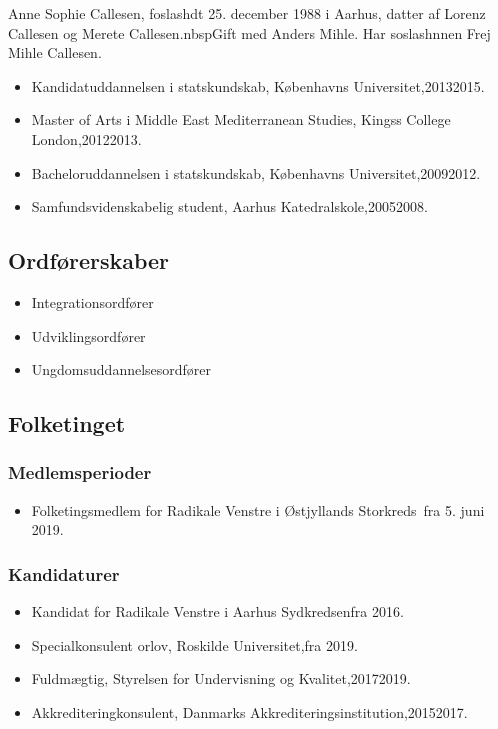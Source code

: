 \documentclass[11pt, a4paper]{awesome-cv}
\begin{document}
\makecvheader[R]
\makelettertitle
\begin{cvletter}
Anne Sophie Callesen, foslashdt 25. december 1988 i Aarhus, datter af Lorenz Callesen og Merete Callesen.nbspGift med Anders Mihle. Har soslashnnen Frej Mihle Callesen.

\begin{itemize}
\item Kandidatuddannelsen i statskundskab, Københavns Universitet,20132015.
\item Master of Arts i Middle East  Mediterranean Studies, Kingss College London,20122013.
\item Bacheloruddannelsen i statskundskab, Københavns Universitet,20092012.
\item Samfundsvidenskabelig student, Aarhus Katedralskole,20052008.
\end{itemize}
\subsection*{Ordførerskaber}
\begin{itemize}
\item Integrationsordfører
\item Udviklingsordfører
\item Ungdomsuddannelsesordfører
\end{itemize}
\subsection*{Folketinget}
\subsubsection*{Medlemsperioder}
\begin{itemize}
\item Folketingsmedlem for Radikale Venstre i Østjyllands Storkreds fra 5. juni 2019.
\end{itemize}
\subsubsection*{Kandidaturer}
\begin{itemize}
\item Kandidat for Radikale Venstre i Aarhus Sydkredsenfra 2016.
\end{itemize}
\begin{itemize}
\item Specialkonsulent orlov, Roskilde Universitet,fra 2019.
\item Fuldmægtig, Styrelsen for Undervisning og Kvalitet,20172019.
\item Akkrediteringkonsulent, Danmarks Akkrediteringsinstitution,20152017.
\end{itemize}
\end{cvletter}
\end{document}
